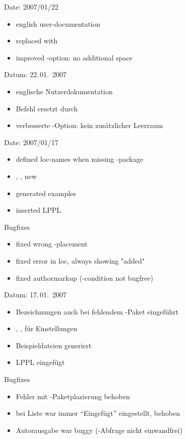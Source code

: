 
\ifENGLISH
	Date: 2007/01/22
	\begin{itemize}
	\item english user-documentation
	\item replaced  with 
	\item improved -option: no additional space
	\end{itemize}
\fi
	\ifGERMAN
		Datum: 22.\,01.~2007
		\begin{itemize}
		\item englische Nutzerdokumentation
		\item Befehl  ersetzt durch 
		\item verbesserte -Option: kein zusätzlicher Leerraum
		\end{itemize}
	\fi


\ifENGLISH
	Date: 2007/01/17
	\begin{itemize}
	\item defined loc-names when missing -package
	\item {}, ,  new
	\item generated examples
	\item inserted LPPL
	\end{itemize}
	Bugfixes
	\begin{itemize}
	\item fixed wrong -placement
	\item fixed error in loc, always showing "added"
	\item fixed authormarkup (-condition not bugfree)
	\end{itemize}
\fi
	\ifGERMAN
		Datum: 17.\,01.~2007
		\begin{itemize}
		\item Bezeichnungen auch bei fehlendem -Paket eingeführt
		\item {}, ,  für Einstellungen
		\item Beispieldateien generiert
		\item LPPL eingefügt
		\end{itemize}
		Bugfixes
		\begin{itemize}
		\item Fehler mit -Paketplazierung behoben
		\item bei Liste war immer "`Eingefügt"' eingestellt, behoben
		\item Autorausgabe war buggy (-Abfrage nicht einwandfrei)
		\end{itemize}
	\fi

